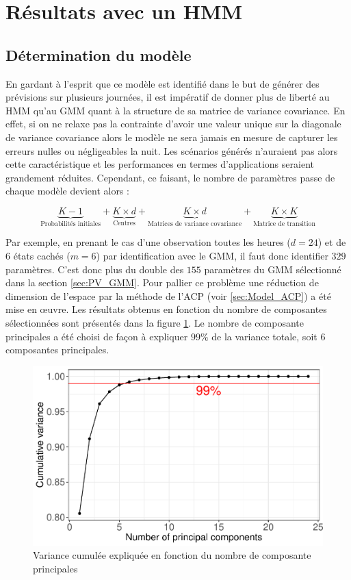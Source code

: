 \documentclass[12pt, french]{report}
\begin{document}
\section{Résultats avec un HMM}
\label{sec:PV_HMM}

\subsection{Détermination du modèle}

En gardant à l'esprit que ce modèle est identifié dans le but de générer des prévisions sur plusieurs journées, il est impératif de donner plus de liberté au HMM qu'au GMM quant à la structure de sa matrice de variance covariance. En effet, si on ne relaxe pas la contrainte d'avoir une valeur unique sur la diagonale de variance covariance alors le modèle ne sera jamais en mesure de capturer les erreurs nulles ou négligeables la nuit. Les scénarios générés n'auraient pas alors cette caractéristique et les performances en termes d'applications seraient grandement réduites. Cependant, ce faisant, le nombre de paramètres passe de chaque modèle devient alors :

\begin{equation}
\underbrace{K-1}_\text{Probabilités initiales}  + \underbrace{K \times d}_\text{Centres}  +  \underbrace{K \times d}_\text{Matrices de variance covariance} + \underbrace{K \times K}_\text{Matrice de transition}
\end{equation}

Par exemple, en prenant le cas d'une observation toutes les heures ($d=24$) et de 6 états cachés ($m=6$) par identification avec le GMM, il faut donc identifier $329$ paramètres. C'est donc plus du double des $155$ paramètres du GMM sélectionné dans la section \ref{sec:PV_GMM}. Pour pallier ce problème une réduction de dimension de l'espace par la méthode de l'ACP (voir \ref{sec:Model_ACP}) a été mise en œuvre. Les résultats obtenus en fonction du nombre de composantes sélectionnées sont présentés dans la figure \ref{fig:PV_HMM_ACP_DimSelect}. Le nombre de composante principales a été choisi de façon à expliquer $99 \%$ de la variance totale, soit 6 composantes principales. 

\begin{figure}[htbp]
	\centering
	\includegraphics[width = 0.6 \linewidth]{Images/PV/ACP/ACP_DimSelect.pdf}
	\caption{Variance cumulée expliquée en fonction du nombre de composante principales}
	\label{fig:PV_HMM_ACP_DimSelect}
\end{figure}
\end{document}
